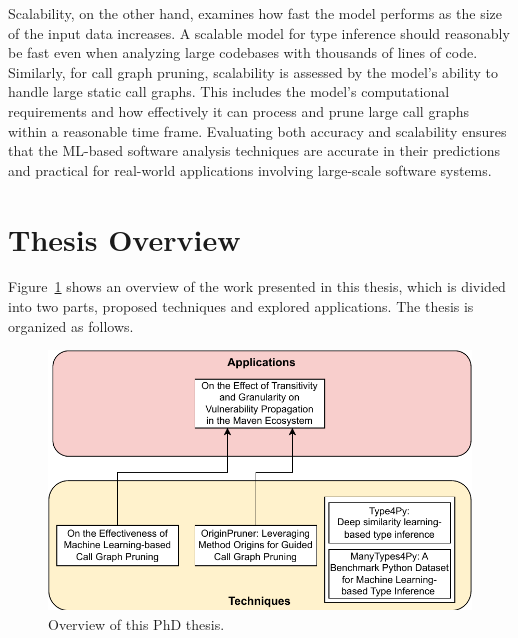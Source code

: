 Scalability, on the other hand, examines how fast the model performs as the size of the input data increases. A scalable model for type inference should reasonably be fast even when analyzing large codebases with thousands of lines of code. Similarly, for call graph pruning, scalability is assessed by the model's ability to handle large static call graphs. This includes the model's computational requirements and how effectively it can process and prune large call graphs within a reasonable time frame. Evaluating both accuracy and scalability ensures that the ML-based software analysis techniques are accurate in their predictions and practical for real-world applications involving large-scale software systems.

\section{Thesis Overview}
Figure~\ref{intro:fig:overall} shows an overview of the work presented in this thesis, which is divided into two parts, proposed techniques and explored applications. The thesis is organized as follows.

\begin{figure}[!t]
 \centering
 \includegraphics[width=\linewidth]{introduction/figs/thesis_overview.pdf}
 \caption{Overview of this PhD thesis.}
 \label{intro:fig:overall}
\end{figure}

